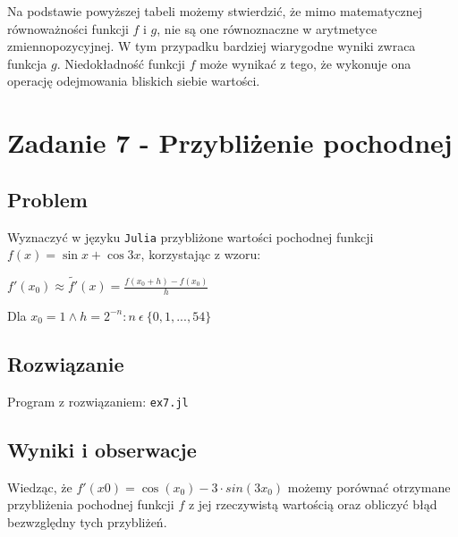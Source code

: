 \documentclass[12pt]{article}
\begin{document}
        \noindent Na podstawie powyższej tabeli możemy stwierdzić, że mimo matematycznej równoważności
        funkcji $f$ i $g$, nie są one równoznaczne w arytmetyce zmiennopozycyjnej.
        \newline
        W tym przypadku bardziej wiarygodne wyniki zwraca funkcja $g$.
        Niedokładność funkcji $f$ może wynikać z tego, że wykonuje ona operację odejmowania bliskich siebie wartości.


\newpage

\section*{Zadanie 7 - Przybliżenie pochodnej}
    \subsection*{Problem}
        Wyznaczyć w języku \texttt{Julia} przybliżone wartości pochodnej funkcji $f(x) = \sin{x} + \cos{3x}$, korzystając z wzoru:
        \begin{center}
        \begin{math}
            f'(x_0) \approx \tilde{f'}(x) = \frac{f(x_0 + h) - f(x_0)}{h}
        \end{math}
        \end{center}
        Dla $x_0 = 1 \land h = 2^{-n} : n \: \epsilon \: \{0, 1, ..., 54\}$
        \newline

    \subsection*{Rozwiązanie}
        Program z rozwiązaniem: \texttt{ex7.jl}
        \newline

    \subsection*{Wyniki i obserwacje}
        Wiedząc, że $f'(x0) = \cos(x_0) - 3 \cdot sin(3x_0)$ możemy porównać otrzymane przybliżenia
        pochodnej funkcji $f$ z jej rzeczywistą wartością oraz obliczyć błąd bezwzględny tych przybliżeń.
\end{document}
